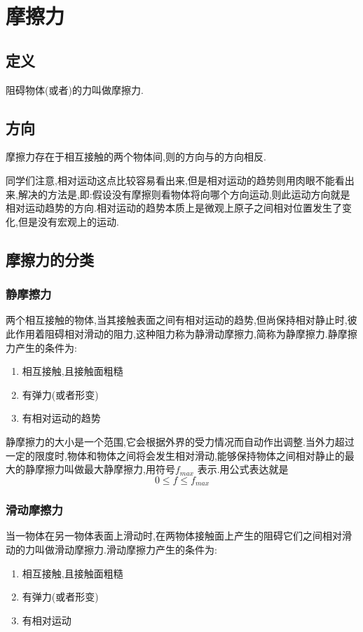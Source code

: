 \section{摩擦力}
\subsection{定义}
阻碍物体(或者)的力叫做摩擦力.
\subsection{方向}
摩擦力存在于相互接触的两个物体间,则的方向与的方向相反.

同学们注意,相对运动这点比较容易看出来,但是相对运动的趋势则用肉眼不能看出来,解决的方法是,即:假设没有摩擦则看物体将向哪个方向运动,则此运动方向就是相对运动趋势的方向.相对运动的趋势本质上是微观上原子之间相对位置发生了变化,但是没有宏观上的运动.

\subsection{摩擦力的分类}
\subsubsection{静摩擦力}
两个相互接触的物体,当其接触表面之间有相对运动的趋势,但尚保持相对静止时,彼此作用着阻碍相对滑动的阻力,这种阻力称为静滑动摩擦力,简称为静摩擦力.静摩擦力产生的条件为:
\begin{enumerate}
  \item 相互接触,且接触面粗糙
  \item 有弹力(或者形变)
  \item 有相对运动的趋势
\end{enumerate}

静摩擦力的大小是一个范围,它会根据外界的受力情况而自动作出调整.当外力超过一定的限度时,物体和物体之间将会发生相对滑动,能够保持物体之间相对静止的最大的静摩擦力叫做最大静摩擦力,用符号$f_{max}$  表示.用公式表达就是
\begin{equation}
  0\leqslant f\leqslant f_{max}
  \label{eq:jingmoca}
\end{equation}

\subsubsection{滑动摩擦力}
当一物体在另一物体表面上滑动时,在两物体接触面上产生的阻碍它们之间相对滑动的力叫做滑动摩擦力.滑动摩擦力产生的条件为:
\begin{enumerate}
  \item 相互接触,且接触面粗糙
  \item 有弹力(或者形变)
  \item 有相对运动
\end{enumerate}

